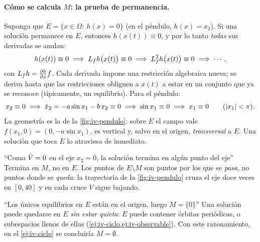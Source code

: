\paragraph{Cómo se calcula $M$: la prueba de permanencia.} Suponga que $E=\{x\in\Omega:\ h(x)=0\}$ (en el péndulo, $h(x)=x_2$). Si una solución permanece en $E$, entonces $h(x(t))\equiv0$, y por lo tanto \emph{todas} sus derivadas se anulan:
\begin{equation}
  h(x(t))\equiv0\;\Longrightarrow\;L_{f}h\bigl(x(t)\bigr)\equiv0\;\Longrightarrow\;L_{f}^2h\bigl(x(t)\bigr)\equiv0\;\Longrightarrow\;\cdots,
  \label{eq:iv-permanencia}
\end{equation}
con $L_{f}h=\frac{\partial h}{\partial x} f$. Cada derivada impone una restricción algebraica nueva; se deriva hasta que las restricciones obliguen a $x(t)$ a estar en un conjunto que ya se reconoce (típicamente, un equilibrio). Para el péndulo:
\[
  x_2\equiv0\;\Longrightarrow\;\dot x_2=-a\sin x_1-b\,x_2\equiv0\;\Longrightarrow\;\sin x_1\equiv0\;\Longrightarrow\; x_1\equiv0\qquad(\left\lvert x_1\right\rvert<\pi).
\]
La geometría es la de la \cref{fig:iv-pendulo}: sobre $E$ el campo vale $f(x_1,0)=(0,-a\sin x_1)$, es vertical y, salvo en el origen, \emph{transversal} a $E$. Una solución que toca $E$ lo atraviesa de inmediato.

\begin{trampa}[label=tr:iv-EM]{``Como $\dot V=0$ en el eje $x_2=0$, la solución termina en algún punto del eje''}
Termina en $M$, no en $E$. Los puntos de $E\setminus M$ son puntos por los que se \emph{pasa}, no puntos donde se \emph{queda}: la trayectoria de la \cref{fig:iv-pendulo} cruza el eje doce veces en $[0,40]$ y en cada cruce $V$ sigue bajando.
\end{trampa}

\begin{trampa}[label=tr:iv-equilibrios]{``Los únicos equilibrios en $E$ están en el origen, luego $M=\{0\}$''}
Una solución puede quedarse en $E$ \emph{sin estar quieta}: $E$ puede contener órbitas periódicas, o subespacios llenos de ellas (\cref{ej:iv-ciclo,ej:iv-observable}). Con este razonamiento, en el \cref{ej:iv-ciclo} se concluiría $M=\emptyset$.
\end{trampa}


